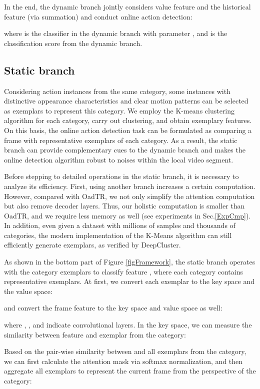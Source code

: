 \documentclass[10pt,twocolumn,letterpaper]{article}
\begin{document}
In the end, the dynamic branch jointly considers value feature  and the historical feature  (\eg via summation) and conduct online action detection:

where  is the classifier in the dynamic branch with parameter , and  is the classification score from the dynamic branch.


\subsection{Static branch}

Considering action instances from the same category, some instances with distinctive appearance characteristics and clear motion patterns can be selected as exemplars to represent this category. We employ the K-means clustering algorithm for each category, carry out clustering, and obtain  exemplary features. On this basis, the online action detection task can be formulated as comparing a frame with representative exemplars of each category. As a result, the static branch can provide complementary cues to the dynamic branch and makes the online detection algorithm robust to noises within the local video segment.

Before stepping to detailed operations in the static branch, it is necessary to analyze its efficiency. First, using another branch increases a certain computation. However, compared with OadTR\cite{wang2021oadtr}, we not only simplify the attention computation but also remove decoder layers. Thus, our holistic computation is smaller than OadTR\cite{wang2021oadtr}, and we require less memory as well (see experiments in Sec.\ref{ExpCmp}). In addition, even given a dataset with millions of samples and thousands of categories, the modern implementation\cite{johnson2019billion} of the K-Means algorithm can still efficiently generate exemplars, as verified by DeepCluster\cite{caron2018deep}.

As shown in the bottom part of Figure \ref{figFramework}, the static branch operates with the category exemplars  to classify feature , where each category contains  representative exemplars. At first, we convert each exemplar  to the key space and the value space:

and convert the frame feature  to the key space and value space as well:

where , ,  and  indicate convolutional layers. In the key space, we can measure the similarity between feature  and exemplar  from the  category:

Based on the pair-wise similarity between  and all exemplars  from the  category, we can first calculate the attention mask  via softmax normalization, and then aggregate all exemplars to represent the current frame from the perspective of the  category:
\end{document}
